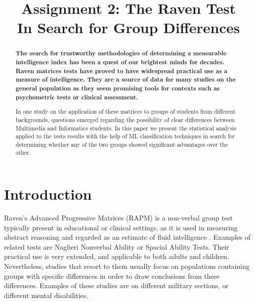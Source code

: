 \documentclass[extendedabs]{recpad2k}
\title{Assignment 2: The Raven Test \\ \LARGE{In Search for Group Differences}}
\begin{document}
\maketitle

\begin{abstract} %
   \vspace{-10pt}
   {\bf 
      The search for trustworthy methodologies of determining a measurable intelligence index has been a quest of our brightest minds for decades.
      Raven matrices tests have proved to have widespread practical use as a measure of intelligence.
      They are a source of data for many studies on the general population as they seem promising tools for contexts such as psychometric tests or clinical assessment.

      In one study on the application of these matrices to groups of students from different backgrounds, questions emerged regarding the possibility of clear 
      differences between Multimedia and Informatics students.
      In this paper we present the statistical analysis applied to the tests results with the help of ML classification techniques in search for determining 
      whether any of the two groups showed significant advantages over the other.
   }
\end{abstract} 


\section{Introduction} %

Raven's Advanced Progressive Matrices (RAPM) is a non-verbal group test typically present in educational or clinical settings, as it is used in measuring 
abstract reasoning and regarded as an estimate of fluid intelligence \cite{rapm}.
Examples of related tests are Naglieri Nonverbal Ability or Spacial Ability Tests.
Their practical use is very extended, and applicable to both adults and children.
Nevertheless, studies that resort to them usually focus on populations containing groups with specific differences in order to draw conclusions from these differences.
Examples of these studies are on different military sections, or different mental disabilities.
\end{document}
